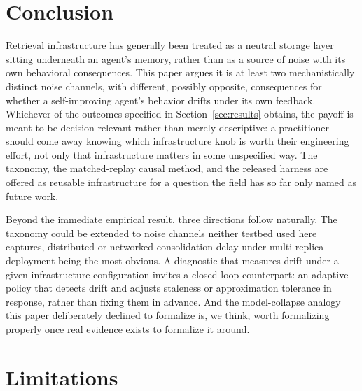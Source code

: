 \documentclass{article}
\begin{document}
\section{Conclusion}
\label{sec:conclusion}

Retrieval infrastructure has generally been treated as a neutral storage layer sitting underneath an agent's memory, rather than as a source of noise with its own behavioral consequences. This paper argues it is at least two mechanistically distinct noise channels, with different, possibly opposite, consequences for whether a self-improving agent's behavior drifts under its own feedback. Whichever of the outcomes specified in Section~\ref{sec:results} obtains, the payoff is meant to be decision-relevant rather than merely descriptive: a practitioner should come away knowing which infrastructure knob is worth their engineering effort, not only that infrastructure matters in some unspecified way. The taxonomy, the matched-replay causal method, and the released harness are offered as reusable infrastructure for a question the field has so far only named as future work.

Beyond the immediate empirical result, three directions follow naturally. The taxonomy could be extended to noise channels neither testbed used here captures, distributed or networked consolidation delay under multi-replica deployment being the most obvious. A diagnostic that measures drift under a given infrastructure configuration invites a closed-loop counterpart: an adaptive policy that detects drift and adjusts staleness or approximation tolerance in response, rather than fixing them in advance. And the model-collapse analogy this paper deliberately declined to formalize is, we think, worth formalizing properly once real evidence exists to formalize it around.

\section*{Limitations}
\end{document}
